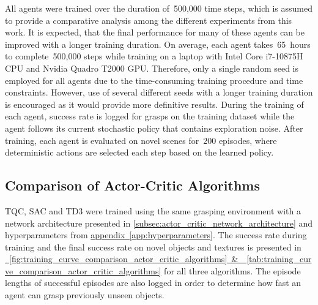 All agents were trained over the duration of~500,000 time steps, which is assumed to provide a comparative analysis among the different experiments from this work. It is expected, that the final performance for many of these agents can be improved with a longer training duration. On average, each agent takes~65~hours to complete~500,000 steps while training on a laptop with Intel Core i7-10875H CPU and Nvidia Quadro T2000 GPU. Therefore, only a single random seed is employed for all agents due to the time-consuming training procedure and time constraints. However, use of several different seeds with a longer training duration is encouraged as it would provide more definitive results. During the training of each agent, success rate is logged for grasps on the training dataset while the agent follows its current stochastic policy that contains exploration noise. After training, each agent is evaluated on novel scenes for~200 episodes, where deterministic actions are selected each step based on the learned policy.

\subsection{Comparison of Actor-Critic Algorithms}

TQC, SAC and TD3 were trained using the same grasping environment with a network architecture presented in \autoref{subsec:actor_critic_network_architecture} and hyperparameters from \hyperref[app:hyperparameters]{appendix~\ref*{app:hyperparameters}}. The success rate during training and the final success rate on novel objects and textures is presented in \hyperref[fig:training_curve_comparison_actor_critic_algorithms]{\figurename~\ref*{fig:training_curve_comparison_actor_critic_algorithms}~\&~\tablename~\ref*{tab:training_curve_comparison_actor_critic_algorithms}} for all three algorithms. The episode lengths of successful episodes are also logged in order to determine how fast an agent can grasp previously unseen objects.

